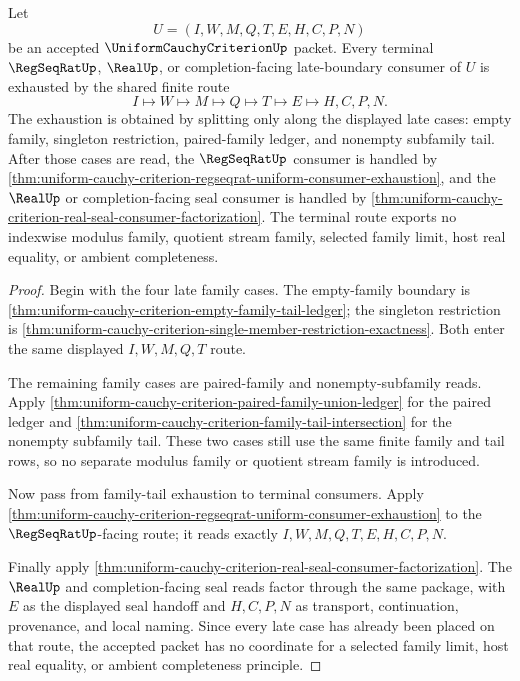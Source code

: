 \begin{theorem}
\label{thm:uniform-cauchy-criterion-terminal-late-route-exhaustion}
Let
$$
U=(I,W,M,Q,T,E,H,C,P,N)
$$
be an accepted $\UniformCauchyCriterionUp$ packet. Every terminal $\RegSeqRatUp$, $\RealUp$, or completion-facing late-boundary consumer of $U$ is exhausted by the shared finite route
$$
I \longmapsto W \longmapsto M \longmapsto Q \longmapsto T \longmapsto E \longmapsto H,C,P,N.
$$
The exhaustion is obtained by splitting only along the displayed late cases: empty family, singleton restriction, paired-family ledger, and nonempty subfamily tail. After those cases are read, the $\RegSeqRatUp$ consumer is handled by \autoref{thm:uniform-cauchy-criterion-regseqrat-uniform-consumer-exhaustion}, and the $\RealUp$ or completion-facing seal consumer is handled by \autoref{thm:uniform-cauchy-criterion-real-seal-consumer-factorization}. The terminal route exports no indexwise modulus family, quotient stream family, selected family limit, host real equality, or ambient completeness.
\end{theorem}
\begin{proof}
Begin with the four late family cases. The empty-family boundary is \autoref{thm:uniform-cauchy-criterion-empty-family-tail-ledger}; the singleton restriction is \autoref{thm:uniform-cauchy-criterion-single-member-restriction-exactness}. Both enter the same displayed $I,W,M,Q,T$ route.

The remaining family cases are paired-family and nonempty-subfamily reads. Apply \autoref{thm:uniform-cauchy-criterion-paired-family-union-ledger} for the paired ledger and \autoref{thm:uniform-cauchy-criterion-family-tail-intersection} for the nonempty subfamily tail. These two cases still use the same finite family and tail rows, so no separate modulus family or quotient stream family is introduced.

Now pass from family-tail exhaustion to terminal consumers. Apply \autoref{thm:uniform-cauchy-criterion-regseqrat-uniform-consumer-exhaustion} to the $\RegSeqRatUp$-facing route; it reads exactly $I,W,M,Q,T,E,H,C,P,N$.

Finally apply \autoref{thm:uniform-cauchy-criterion-real-seal-consumer-factorization}. The $\RealUp$ and completion-facing seal reads factor through the same package, with $E$ as the displayed seal handoff and $H,C,P,N$ as transport, continuation, provenance, and local naming. Since every late case has already been placed on that route, the accepted packet has no coordinate for a selected family limit, host real equality, or ambient completeness principle.
\end{proof}

